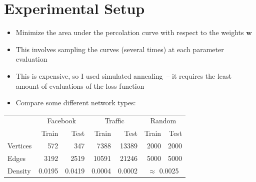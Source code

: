 \documentclass{beamer}
\begin{document}
\section{Experimental Setup}
\begin{frame}
  \begin{itemize}
  \item Minimize the area under the percolation curve with respect to the weights \(\mathbf{w}\)
  \item This involves sampling the curves (several times) at each parameter evaluation
  \item This is expensive, so I used simulated annealing~-- it requires the least amount of
    evaluations of the loss function
  \item Compare some different network types:
  \end{itemize}

  \begin{center}
    \begin{tabular}{lrrrrrr}
      \toprule
      & \multicolumn{2}{c}{Facebook} & \multicolumn{2}{c}{Traffic} & \multicolumn{2}{c}{Random} \\
      & Train & Test & Train & Test & Train & Test \\
      \midrule
      Vertices & 572 & 347 & 7388 & 13389 & 2000 & 2000\\
      Edges & 3192 & 2519 & 10591 & 21246 & 5000 & 5000\\
      Density & 0.0195 & 0.0419 & 0.0004 & 0.0002 & \multicolumn{2}{c}{\(\approx\) 0.0025}\\
      \bottomrule
    \end{tabular}
  \end{center}
\end{frame}



\end{document}
